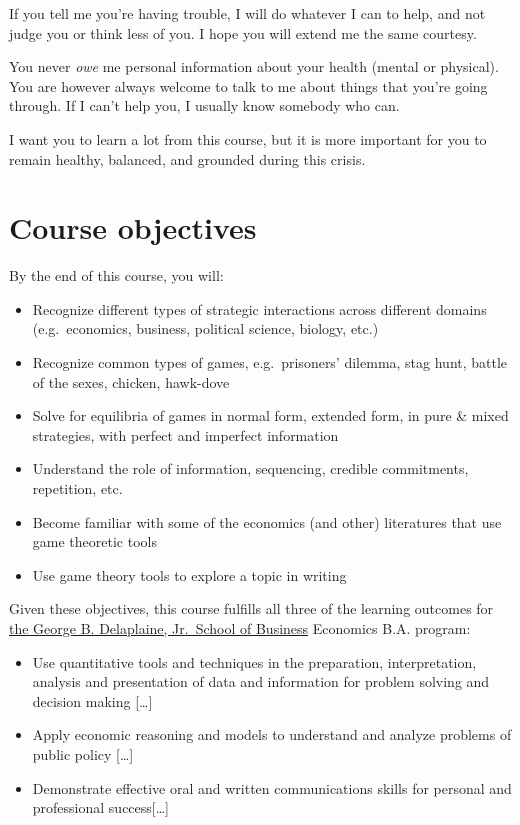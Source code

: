 \documentclass{article}
\providecommand{\tightlist}{%
  \setlength{\itemsep}{0pt}\setlength{\parskip}{0pt}}
\begin{document}
If you tell me you're having trouble, I will do whatever I can to help,
and not judge you or think less of you. I hope you will extend me the
same courtesy.

You never \emph{owe} me personal information about your health (mental
or physical). You are however always welcome to talk to me about things
that you're going through. If I can't help you, I usually know somebody
who can.

I want you to learn a lot from this course, but it is more important for
you to remain healthy, balanced, and grounded during this crisis.

\hypertarget{course-objectives}{%
\section{Course objectives}\label{course-objectives}}

{By the end of this course,} you will:

\begin{itemize}
\tightlist
\item
  Recognize different types of strategic interactions across different
  domains (e.g.~economics, business, political science, biology, etc.)
\item
  Recognize common types of games, e.g.~prisoners' dilemma, stag hunt,
  battle of the sexes, chicken, hawk-dove
\item
  Solve for equilibria of games in normal form, extended form, in pure
  \& mixed strategies, with perfect and imperfect information
\item
  Understand the role of information, sequencing, credible commitments,
  repetition, etc.
\item
  Become familiar with some of the economics (and other) literatures
  that use game theoretic tools
\item
  Use game theory tools to explore a topic in writing
\end{itemize}

Given these objectives, this course fulfills all three of the learning
outcomes for
\href{https://www.hood.edu/academics/departments/george-b-delaplaine-jr-school-business/student-learning-outcomes}{the
George B. Delaplaine, Jr.~School of Business} Economics B.A. program:

\begin{itemize}
\tightlist
\item
  Use quantitative tools and techniques in the preparation,
  interpretation, analysis and presentation of data and information for
  problem solving and decision making {[}\ldots{]}
\item
  Apply economic reasoning and models to understand and analyze problems
  of public policy {[}\ldots{]}
\item
  Demonstrate effective oral and written communications skills for
  personal and professional success{[}\ldots{]}
\end{itemize}
\end{document}
